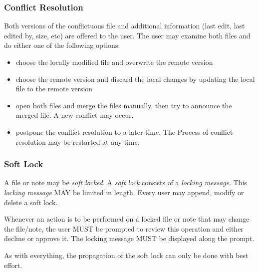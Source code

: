 \subsubsection{Conflict Resolution}
Both versions of the conflictuous file and additional information (last edit, last edited by, size, etc) are offered to the user. The user may examine both files and do either one of the following options:
\begin{itemize}
\item choose the locally modified file and overwrite the remote version
\item choose the remote version and discard the local changes by updating the local file to the remote version
\item open both files and merge the files manually, then try to announce the merged file. A new conflict may occur.
\item postpone the conflict resolution to a later time. The Process of conflict resolution may be restarted at any time.
\end{itemize}

\subsubsection{Soft Lock}
A file or note may be \emph{soft locked}. A \emph{soft lock} consists of a \emph{locking message}. This \emph{locking message} MAY be limited in length. Every user may append, modify or delete a soft lock. 

Whenever an action is to be performed on a locked file or note that may change the file/note, the user MUST be prompted to review this operation and either decline or approve it. The locking message MUST be displayed along the prompt.

As with everything, the propagation of the soft lock can only be done with best effort.


